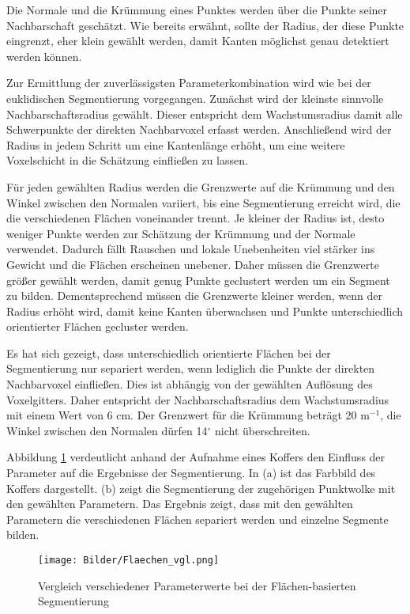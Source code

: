 Die Normale und die Krümmung eines Punktes werden über die Punkte seiner Nachbarschaft geschätzt. Wie bereits erwähnt, sollte der Radius, der diese Punkte eingrenzt, eher klein gewählt werden, damit Kanten möglichst genau detektiert werden können. 

Zur Ermittlung der zuverlässigsten Parameterkombination wird wie bei der euklidischen Segmentierung vorgegangen. Zunächst wird der kleinste sinnvolle Nachbarschaftsradius gewählt. Dieser entspricht dem Wachstumsradius damit alle Schwerpunkte der direkten Nachbarvoxel erfasst werden. Anschließend wird der Radius in jedem Schritt um eine Kantenlänge erhöht, um eine weitere Voxelschicht in die Schätzung einfließen zu lassen. 

Für jeden gewählten Radius werden die Grenzwerte auf die Krümmung und den Winkel zwischen den Normalen variiert, bis eine Segmentierung erreicht wird, die die verschiedenen Flächen voneinander trennt. Je kleiner der Radius ist, desto weniger Punkte werden zur Schätzung der Krümmung und der Normale verwendet. Dadurch fällt Rauschen und lokale Unebenheiten viel stärker ins Gewicht und die Flächen erscheinen unebener. Daher müssen die Grenzwerte größer gewählt werden, damit genug Punkte geclustert werden um ein Segment zu bilden. Dementsprechend müssen die Grenzwerte kleiner werden, wenn der Radius erhöht wird, damit keine Kanten überwachsen und Punkte unterschiedlich orientierter Flächen gecluster werden. 

Es hat sich gezeigt, dass unterschiedlich orientierte Flächen bei der Segmentierung nur separiert werden, wenn lediglich die Punkte der direkten Nachbarvoxel einfließen. Dies ist abhängig von der gewählten Auflösung des Voxelgitters. Daher entspricht der Nachbarschaftsradius dem Wachstumsradius mit einem Wert von 6 cm. Der Grenzwert für die Krümmung beträgt 20 $ \text{m}^{-1} $, die Winkel zwischen den Normalen dürfen 14$ ^\circ $ nicht überschreiten.

Abbildung \ref{fig:vgl_smoothness} verdeutlicht anhand der Aufnahme eines Koffers den Einfluss der Parameter auf die Ergebnisse der Segmentierung. In (a) ist das Farbbild des Koffers dargestellt. (b) zeigt die Segmentierung der zugehörigen Punktwolke mit den gewählten Parametern. Das Ergebnis zeigt, dass mit den gewählten Parametern die verschiedenen Flächen separiert werden und einzelne Segmente bilden. 

\begin{figure}[htb]
	\centering
	\texttt{[image: Bilder/Flaechen\_vgl.png]}
	\caption{Vergleich verschiedener Parameterwerte bei der Flächen-basierten Segmentierung}
	\label{fig:vgl_smoothness}
\end{figure}

